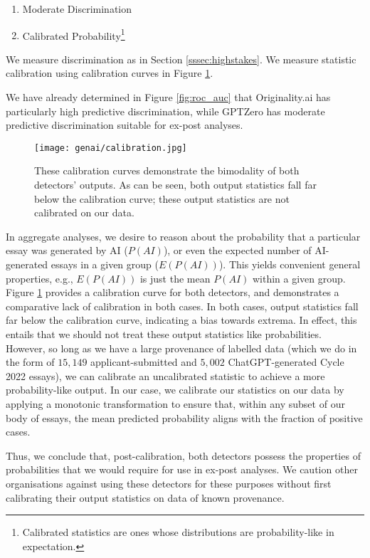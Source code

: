 \begin{enumerate}
    \item Moderate Discrimination
    \item Calibrated Probability\footnote{Calibrated statistics are ones whose distributions are probability-like in expectation.}
\end{enumerate}

We measure discrimination as in Section \ref{sssec:highstakes}. We measure statistic calibration using calibration curves in Figure \ref{fig:calibration}.

We have already determined in Figure \ref{fig:roc_auc} that Originality.ai has particularly high predictive discrimination, while GPTZero has moderate predictive discrimination suitable for ex-post analyses.

\begin{figure}[htb]
  \centering
  \texttt{[image: genai/calibration.jpg]}
  \caption{These calibration curves demonstrate the bimodality of both detectors' outputs. As can be seen, both output statistics fall far below the calibration curve; these output statistics are not calibrated on our data.}
  \label{fig:calibration}
\end{figure}

In aggregate analyses, we desire to reason about the probability that a particular essay was generated by AI ($P(AI)$), or even the expected number of AI-generated essays in a given group ($E(P(AI))$). This yields convenient general properties, e.g., $E(P(AI))$ is just the mean $P(AI)$ within a given group. Figure \ref{fig:calibration} provides a calibration curve for both detectors, and demonstrates a comparative lack of calibration in both cases. In both cases, output statistics fall far below the calibration curve, indicating a bias towards extrema. In effect, this entails that we should not treat these output statistics like probabilities. However, so long as we have a large provenance of labelled data (which we do in the form of $15,149$ applicant-submitted and $5,002$ ChatGPT-generated Cycle 2022 essays), we can calibrate an uncalibrated statistic to achieve a more probability-like output. In our case, we calibrate our statistics on our data by applying a monotonic transformation to ensure that, within any subset of our body of essays, the mean predicted probability aligns with the fraction of positive cases.

Thus, we conclude that, post-calibration, both detectors possess the properties of probabilities that we would require for use in ex-post analyses. We caution other organisations against using these detectors for these purposes without first calibrating their output statistics on data of known provenance.

